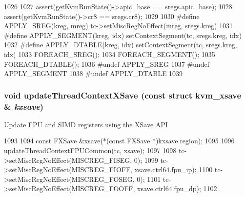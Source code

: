 \begin{DoxyCode}
1026 {
1027     assert(getKvmRunState()->apic_base == sregs.apic_base);
1028     assert(getKvmRunState()->cr8 == sregs.cr8);
1029 
1030 #define APPLY_SREG(kreg, mreg) tc->setMiscRegNoEffect(mreg, sregs.kreg)
1031 #define APPLY_SEGMENT(kreg, idx) setContextSegment(tc, sregs.kreg, idx)
1032 #define APPLY_DTABLE(kreg, idx) setContextSegment(tc, sregs.kreg, idx)
1033     FOREACH_SREG();
1034     FOREACH_SEGMENT();
1035     FOREACH_DTABLE();
1036 #undef APPLY_SREG
1037 #undef APPLY_SEGMENT
1038 #undef APPLY_DTABLE
1039 }
\end{DoxyCode}
\hypertarget{classX86KvmCPU_a64c8d7da4ee94fdaeb4e61d7106c01cf}{
\subsubsection[{updateThreadContextXSave}]{\setlength{\rightskip}{0pt plus 5cm}void updateThreadContextXSave (const struct kvm\_\-xsave \& {\em kxsave})}}
\label{classX86KvmCPU_a64c8d7da4ee94fdaeb4e61d7106c01cf}
Update FPU and SIMD registers using the XSave API 


\begin{DoxyCode}
1093 {
1094     const FXSave &xsave(*(const FXSave *)kxsave.region);
1095 
1096     updateThreadContextFPUCommon(tc, xsave);
1097 
1098     tc->setMiscRegNoEffect(MISCREG_FISEG, 0);
1099     tc->setMiscRegNoEffect(MISCREG_FIOFF, xsave.ctrl64.fpu_ip);
1100     tc->setMiscRegNoEffect(MISCREG_FOSEG, 0);
1101     tc->setMiscRegNoEffect(MISCREG_FOOFF, xsave.ctrl64.fpu_dp);
1102 }
\end{DoxyCode}


